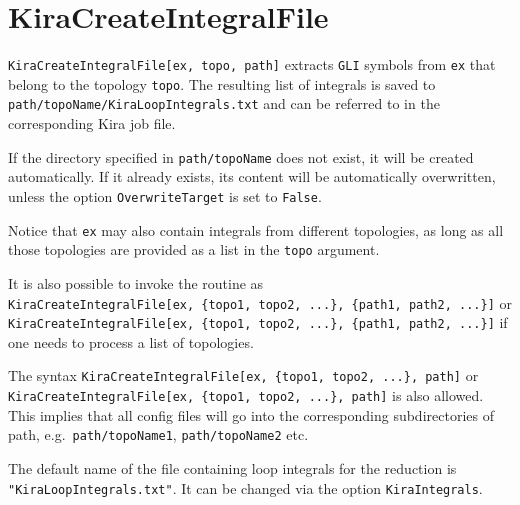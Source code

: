 \documentclass[../FeynHelpersManual.tex]{subfiles}
\begin{document}
\begin{Shaded}
\begin{Highlighting}[]
 
\end{Highlighting}
\end{Shaded}

\hypertarget{kiracreateintegralfile}{
\section{KiraCreateIntegralFile}\label{kiracreateintegralfile}}

\texttt{KiraCreateIntegralFile[\allowbreak{}ex,\ \allowbreak{}topo,\ \allowbreak{}path]}
extracts \texttt{GLI} symbols from \texttt{ex} that belong to the
topology \texttt{topo}. The resulting list of integrals is saved to
\texttt{path/topoName/KiraLoopIntegrals.txt} and can be referred to in
the corresponding Kira job file.

If the directory specified in \texttt{path/topoName} does not exist, it
will be created automatically. If it already exists, its content will be
automatically overwritten, unless the option \texttt{OverwriteTarget} is
set to \texttt{False}.

Notice that \texttt{ex} may also contain integrals from different
topologies, as long as all those topologies are provided as a list in
the \texttt{topo} argument.

It is also possible to invoke the routine as
\texttt{KiraCreateIntegralFile[\allowbreak{}ex,\ \allowbreak{}\{\allowbreak{}topo1,\ \allowbreak{}topo2,\ \allowbreak{}...\},\ \allowbreak{}\{\allowbreak{}path1,\ \allowbreak{}path2,\ \allowbreak{}...\}]}
or
\texttt{KiraCreateIntegralFile[\allowbreak{}ex,\ \allowbreak{}\{\allowbreak{}topo1,\ \allowbreak{}topo2,\ \allowbreak{}...\},\ \allowbreak{}\{\allowbreak{}path1,\ \allowbreak{}path2,\ \allowbreak{}...\}]}
if one needs to process a list of topologies.

The syntax
\texttt{KiraCreateIntegralFile[\allowbreak{}ex,\ \allowbreak{}\{\allowbreak{}topo1,\ \allowbreak{}topo2,\ \allowbreak{}...\},\ \allowbreak{}path]}
or
\texttt{KiraCreateIntegralFile[\allowbreak{}ex,\ \allowbreak{}\{\allowbreak{}topo1,\ \allowbreak{}topo2,\ \allowbreak{}...\},\ \allowbreak{}path]}
is also allowed. This implies that all config files will go into the
corresponding subdirectories of path, e.g.~\texttt{path/topoName1},
\texttt{path/topoName2} etc.

The default name of the file containing loop integrals for the reduction
is \texttt{"KiraLoopIntegrals.txt"}. It can be changed via the option
\texttt{KiraIntegrals}.
\end{document}
